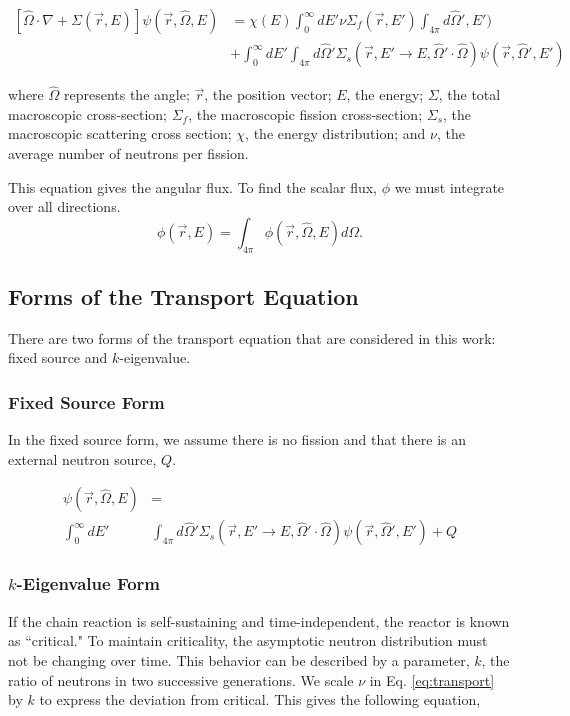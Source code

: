 \begin{equation}
\begin{split}
 [\hat{\Omega} \cdot \nabla + \Sigma(\vec{r}, E)]\psi(\vec{r}, \hat{\Omega}, E) &= \chi(E) \int_0^\infty dE' \nu \Sigma_{f}(\vec{r}, E') \int_{4\pi} d\hat{\Omega}', E') \\   &+ \int_0^\infty dE' \int_{4\pi} d\hat{\Omega}' \Sigma_s(\vec{r}, E' \rightarrow E, \hat{\Omega}' \cdot \hat{\Omega})\psi(\vec{r}, \hat{\Omega}', E')   
\end{split}
\label{eq:transport}
\end{equation}


where $\hat{\Omega}$ represents the angle; $\vec{r}$, the position vector; $E$, the energy; $\Sigma$, the total macroscopic cross-section; $\Sigma_f$, the macroscopic fission cross-section; $\Sigma_s$, the macroscopic scattering cross section; $\chi$, the energy distribution; and $\nu$, the average number of neutrons per fission. 

This equation gives the angular flux. To find the scalar flux, $\phi$ we must integrate over all directions.
\begin{equation}
    \phi(\vec{r}, E) = \int_{4\pi} \phi(\vec{r}, \hat{\Omega}, E) d \Omega.
\end{equation}

\subsection{Forms of the Transport Equation}
There are two forms of the transport equation that are considered in this work: fixed source and $k$-eigenvalue. 

\subsubsection{Fixed Source Form}
In the fixed source form, we assume there is no fission and that there is an external neutron source, $Q$.

\begin{align}
 [\hat{\Omega} \cdot \nabla + \Sigma(\vec{r}, E)]\psi(\vec{r}, \hat{\Omega}, E) &= \\ \int_0^\infty dE' &\int_{4\pi} d\hat{\Omega}' \Sigma_s(\vec{r}, E' \rightarrow E, \hat{\Omega}' \cdot \hat{\Omega})\psi(\vec{r}, \hat{\Omega}', E')  +Q \nonumber
 \label{eq:transport_fixed_source}
\end{align}

\subsubsection{$k$-Eigenvalue Form}
If the chain reaction is self-sustaining and time-independent, the reactor is known as ``critical." To maintain criticality, the asymptotic neutron distribution must not be changing over time. This behavior can be described by a parameter,  $k$, the ratio of neutrons in two successive generations. We scale $\nu$ in Eq. \ref{eq:transport} by $k$ to express the deviation from critical. This gives the following equation,

